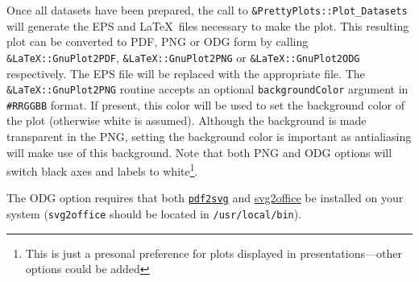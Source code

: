 Once all datasets have been prepared, the call to {\tt \&PrettyPlots::Plot\_Datasets} will generate the EPS and \LaTeX\ files necessary to make the plot. This resulting plot can be converted to PDF, PNG or ODG form by calling {\tt \&LaTeX::GnuPlot2PDF}, {\tt \&LaTeX::GnuPlot2PNG} or {\tt \&LaTeX::GnuPlot2ODG} respectively. The EPS file will be replaced with the appropriate file. The {\tt \&LaTeX::GnuPlot2PNG} routine accepts an optional {\tt backgroundColor} argument in {\tt \#RRGGBB} format. If present, this color will be used to set the background color of the plot (otherwise white is assumed). Although the background is made transparent in the PNG, setting the background color is important as antialiasing will make use of this background. Note that both PNG and ODG options will switch black axes and labels to white\footnote{This is just a presonal preference for plots displayed in presentations---other options could be added}.

The ODG option requires that both \href{http://www.cityinthesky.co.uk/opensource/pdf2svg}{{\tt pdf2svg}} and \href{http://www.haumacher.de/svg-import/}{{svg2office}} be installed on your system ({\tt svg2office} should be located in {\tt /usr/local/bin}).
